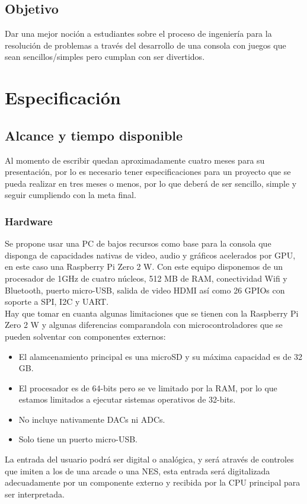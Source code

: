 \documentclass[letterpaper]{article}
\begin{document}
\begin{multicols}{2}
\subsection{Objetivo}
Dar una mejor noción a estudiantes sobre el proceso de ingeniería para la
resolución de problemas a través del desarrollo de una consola con juegos
que sean sencillos/simples pero cumplan con ser divertidos.

\section{Especificación}
\subsection{Alcance y tiempo disponible}
Al momento de escribir quedan aproximadamente cuatro meses para su presentación,
por lo es necesario tener especificaciones para un proyecto que se pueda
realizar en tres meses o menos, por lo que deberá de ser sencillo, simple y
seguir cumpliendo con la meta final.

\subsubsection{Hardware}
Se propone usar una PC de bajos recursos como base para la consola que disponga
de capacidades nativas de video, audio y gráficos acelerados por GPU, en este
caso una Raspberry Pi Zero 2 W. Con este equipo disponemos de un procesador de
1GHz de cuatro núcleos, 512 MB de RAM, conectividad Wifi y Bluetooth, puerto
micro-USB, salida de video HDMI así como 26 GPIOs con soporte a SPI, I2C y
UART.\\
Hay que tomar en cuanta algunas limitaciones que se tienen con la Raspberry Pi
Zero 2 W y algunas diferencias comparandola con microcontroladores que se pueden
solventar con componentes externos:
\begin{itemize}
    \item El alamcenamiento principal es una microSD y su máxima capacidad es de
        32 GB.
    \item El procesador es de 64-bits pero se ve limitado por la RAM, por lo que
        estamos limitados a ejecutar sistemas operativos de 32-bits.
    \item No incluye nativamente DACs ni ADCs.
    \item Solo tiene un puerto micro-USB.
\end{itemize}
La entrada del usuario podrá ser digital o analógica, y será através de
controles que imiten a los de una arcade o una NES, esta entrada será
digitalizada adecuadamente por un componente externo y recibida por la CPU
principal para ser interpretada.


\end{multicols}
\end{document}
